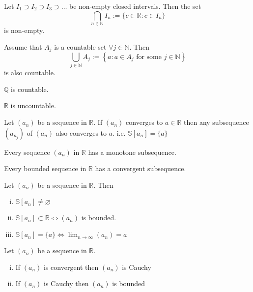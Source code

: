 \documentclass{report}
\theoremstyle{definition}
\begin{document}
\begin{seqt}
    Let $I_1 \supset I_2 \supset I_3 \supset \dots$ be non-empty closed intervals. Then the set
    \[\bigcap_{n\in\mathbb{N}} I_n := \{c\in\mathbb{R}:c\in I_n\} \]
    is non-empty.
\end{seqt}

\begin{seql}
    Assume that $A_j$ is a countable set $\forall j\in\mathbb{N}$. Then
    \[\bigcup_{j\in\mathbb{N}} A_j := \left\{ a: a\in A_j \text{ for some } j\in\mathbb{N} \right\}\]
    is also countable.
\end{seql}

\begin{seqt}
    $\mathbb{Q}$ is countable.
\end{seqt}

\begin{seqt}
    $\mathbb{R}$ is uncountable.
\end{seqt}

\begin{seql}
    Let $(a_n)$ be a sequence in $\mathbb{R}$. If $(a_n)$ converges to $a\in\mathbb{R}$ then any subsequence $(a_{n_j})$ of $(a_n)$
    also converges to $a$. i.e. $\mathbb{S}[a_n] = \{a\}$
\end{seql}

\begin{seql}
    Every sequence $(a_n)$ in $\mathbb{R}$ has a monotone subsequence.
\end{seql}

\begin{seqt}
    Every bounded sequence in $\mathbb{R}$ has a convergent subsequence.
\end{seqt}

\begin{seql}
    Let $(a_n)$ be a sequence in $\mathbb{R}$. Then
    \begin{enumerate}[(i)]
        \item  $\mathbb{S}[a_n]\neq\varnothing$
        \item $\mathbb{S}[a_n] \subset \mathbb{R}\iff (a_n)$ is bounded.
        \item $\mathbb{S}[a_n] = \{a\}\iff\lim_{n\to\infty}(a_n)=a$
    \end{enumerate}
\end{seql}

\begin{seql}
    Let $(a_n)$ be a sequence in $\mathbb{R}$.
    \begin{enumerate}[(i)]
        \item  If $(a_n)$ is convergent then $(a_n)$ is Cauchy
        \item  If $(a_n)$ is Cauchy then $(a_n)$ is bounded
    \end{enumerate}
\end{seql}
\end{document}
